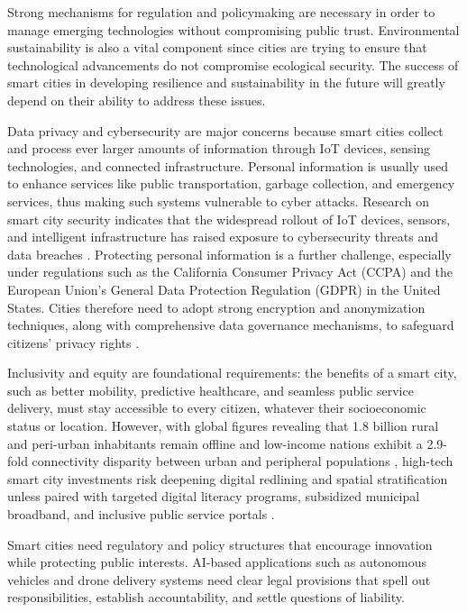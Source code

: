 \documentclass[pdflatex,sn-mathphys-num]{sn-jnl}%
\theoremstyle{thmstyleone}%
\theoremstyle{thmstyletwo}%
\theoremstyle{thmstylethree}%
\begin{document}
Strong mechanisms for regulation and policymaking are necessary in order to manage emerging technologies without compromising public trust. Environmental sustainability is also a vital component since cities are trying to ensure that technological advancements do not compromise ecological security. The success of smart cities in developing resilience and sustainability in the future will greatly depend on their ability to address these issues.

Data privacy and cybersecurity are major concerns because smart cities collect and process ever larger amounts of information through IoT devices, sensing technologies, and connected infrastructure. Personal information is usually used to enhance services like public transportation, garbage collection, and emergency services, thus making such systems vulnerable to cyber attacks. Research on smart city security indicates that the widespread rollout of IoT devices, sensors, and intelligent infrastructure has raised exposure to cybersecurity threats and data breaches \cite{r91}. Protecting personal information is a further challenge, especially under regulations such as the California Consumer Privacy Act (CCPA) and the European Union's General Data Protection Regulation (GDPR) in the United States. Cities therefore need to adopt strong encryption and anonymization techniques, along with comprehensive data governance mechanisms, to safeguard citizens' privacy rights \cite{r92}.

Inclusivity and equity are foundational requirements: the benefits of a smart city, such as better mobility, predictive healthcare, and seamless public service delivery, must stay accessible to every citizen, whatever their socioeconomic status or location. However, with global figures revealing that 1.8 billion rural and peri-urban inhabitants remain offline and low-income nations exhibit a 2.9-fold connectivity disparity between urban and peripheral populations \cite{r128}, high-tech smart city investments risk deepening digital redlining and spatial stratification unless paired with targeted digital literacy programs, subsidized municipal broadband, and inclusive public service portals \cite{r101}.

Smart cities need regulatory and policy structures that encourage innovation while protecting public interests. AI-based applications such as autonomous vehicles and drone delivery systems need clear legal provisions that spell out responsibilities, establish accountability, and settle questions of liability.
\end{document}

